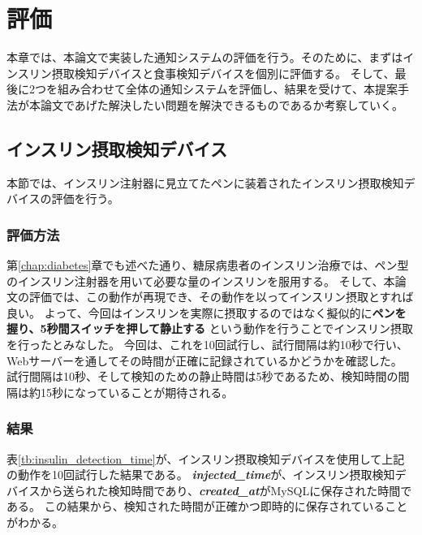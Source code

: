 \chapter{評価}
\label{chap:evaluation}

本章では、本論文で実装した通知システムの評価を行う。そのために、まずはインスリン摂取検知デバイスと食事検知デバイスを個別に評価する。
そして、最後に2つを組み合わせて全体の通知システムを評価し、結果を受けて、本提案手法が本論文であげた解決したい問題を解決できるものであるか考察していく。

\section{インスリン摂取検知デバイス}
本節では、インスリン注射器に見立てたペンに装着されたインスリン摂取検知デバイスの評価を行う。

\subsection{評価方法}
第\ref{chap:diabetes}章でも述べた通り、糖尿病患者のインスリン治療では、ペン型のインスリン注射器を用いて必要な量のインスリンを服用する。
そして、本論文の評価では、この動作が再現でき、その動作を以ってインスリン摂取とすれば良い。
よって、今回はインスリンを実際に摂取するのではなく擬似的に\textbf{ペンを握り、5秒間スイッチを押して静止する}\cite{how_to_inject_insulin_1}\cite{how_to_inject_insulin_2}
という動作を行うことでインスリン摂取を行ったとみなした。
今回は、これを10回試行し、試行間隔は約10秒で行い、Webサーバーを通してその時間が正確に記録されているかどうかを確認した。
試行間隔は10秒、そして検知のための静止時間は5秒であるため、検知時間の間隔は約15秒になっていることが期待される。

\subsection{結果}

表\ref{tb:insulin_detection_time}が、インスリン摂取検知デバイスを使用して上記の動作を10回試行した結果である。
\textbf{\textit{injected\_time}}が、インスリン摂取検知デバイスから送られた検知時間であり、\textbf{\textit{created\_at}}がMySQLに保存された時間である。
この結果から、検知された時間が正確かつ即時的に保存されていることがわかる。

\newpage

